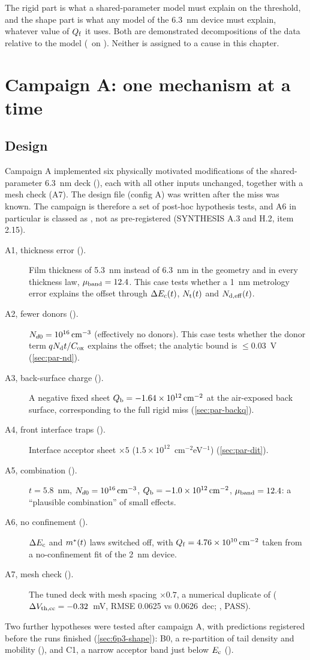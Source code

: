 The rigid part is what a shared-parameter model must explain on the threshold, and the shape part is what any model of the 6.3~nm device must explain, whatever value of $Q_{\mathrm{f}}$ it uses. Both are demonstrated decompositions of the data relative to the model (\evNUM\ on \evDATA). Neither is assigned to a cause in this chapter.

\section{Campaign A: one mechanism at a time}\label{sec:6p3-hypotheses}

\subsection{Design}
Campaign A implemented six physically motivated modifications of the shared-parameter 6.3~nm deck (), each with all other inputs unchanged, together with a mesh check (A7). The design file (config A) was written after the  miss was known. The campaign is therefore a set of post-hoc hypothesis tests, and A6 in particular is classed as \evPOST, not as pre-registered (SYNTHESIS A.3 and H.2, item 2.15).

\begin{description}
\item[A1, thickness error ().] Film thickness of 5.3~nm instead of 6.3~nm in the geometry and in every thickness law, $\mu_{\mathrm{band}}=12.4$. This case tests whether a 1~nm metrology error explains the offset through $\Delta E_{\mathrm{c}}(t)$, $N_{\mathrm{t}}(t)$ and $N_{\mathrm{d,eff}}(t)$.
\item[A2, fewer donors ().] $N_{d0}=10^{16}\,\mathrm{cm}^{-3}$ (effectively no donors). This case tests whether the donor term $qN_{\mathrm{d}} t/C_{\mathrm{ox}}$ explains the offset; the analytic bound is $\le0.03$~V (\cref{sec:par-nd}).
\item[A3, back-surface charge ().] A negative fixed sheet $Q_{\mathrm{b}}=\SI{-1.64e12}{cm^{-2}}$ at the air-exposed back surface, corresponding to the full rigid miss (\cref{sec:par-backq}).
\item[A4, front interface traps ().] Interface acceptor sheet $\times5$ ($1.5\times10^{12}$~cm$^{-2}$eV$^{-1}$) (\cref{sec:par-dit}).
\item[A5, combination ().] $t=5.8$~nm, $N_{d0}=10^{16}\,\mathrm{cm}^{-3}$, $Q_{\mathrm{b}}=\SI{-1.0e12}{cm^{-2}}$, $\mu_{\mathrm{band}}=12.4$: a ``plausible combination'' of small effects.
\item[A6, no confinement ().] $\Delta E_{\mathrm{c}}$ and $m^{*}(t)$ laws switched off, with $Q_{\mathrm{f}}=\SI{4.76e10}{cm^{-2}}$ taken from a no-confinement fit of the 2~nm device.
\item[A7, mesh check ().] The tuned deck with mesh spacing $\times0.7$, a numerical duplicate of  ($\Delta V_{\mathrm{th,cc}}=-0.32$~mV, RMSE 0.0625 vs 0.0626~dec; \evNUM, PASS).
\end{description}
Two further hypotheses were tested after campaign A, with predictions registered before the runs finished (\cref{sec:6p3-shape}): B0, a re-partition of tail density and mobility (), and C1, a narrow acceptor band just below $E_{\mathrm{c}}$ ().


